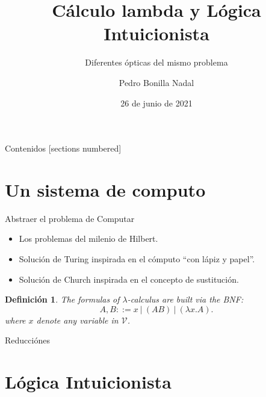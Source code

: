\documentclass[usenames,dvipsnames]{beamer}
\title{Cálculo lambda y Lógica Intuicionista}
\subtitle{Diferentes ópticas del mismo problema}
\date{26 de junio de 2021}
\institute{EsLibre 2021}
\author{Pedro Bonilla Nadal}
\newtheorem{definicion}{Definición}
\begin{document}
\maketitle
\begin{frame}{Contenidos}
  [sections numbered]
  \tableofcontents [hideallsubsections]
\end{frame}

\section{Un sistema de computo}
\begin{frame}{Abstraer el problema de Computar}
  \begin{itemize}
  \item Los problemas del milenio de Hilbert.
  \item Solución de Turing inspirada en el cómputo ``con lápiz y papel''.
  \item Solución de Church inspirada en el concepto de sustitución.
  \end{itemize}
\end{frame}

\begin{frame}
\begin{definicion}
  The formulas of  $\lambda$-calculus are built via the BNF:
  $$A,B ::= x\ |\ (AB)\ |\ (\lambda x.A) .$$
  where $x$ denote any variable in $\mathcal{V}$.
\end{definicion}

\end{frame}

\begin{frame}{Reducciónes}
  
\end{frame}

\begin{frame}

\end{frame}

\begin{frame}
  
\end{frame}


\begin{frame}

\end{frame}



\section{Lógica Intuicionista}
\end{document}
